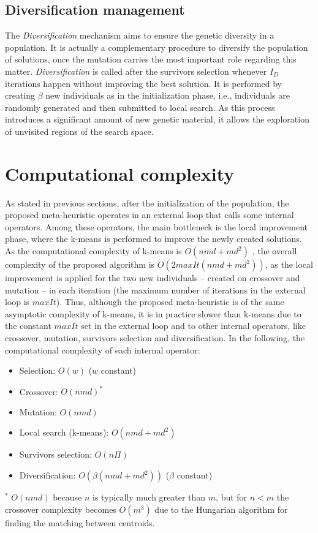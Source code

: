 \subsection{Diversification management}
The \textit{Diversification} mechanism aims to ensure the genetic diversity in a population. It is actually a complementary procedure to diversify the population of solutions, once the mutation carries the most important role regarding this matter. \textit{Diversification} is called after the survivors selection whenever $I_D$ iterations happen without improving the best solution. It is performed by creating $\beta$ new individuals as in the initialization phase, i.e., individuals are randomly generated and then submitted to local search. As this process introduces a significant amount of new genetic material, it allows the exploration of unvisited regions of the search space.

\section{Computational complexity}
As stated in previous sections, after the initialization of the population, the proposed meta-heuristic operates in an external loop that calls some internal operators. Among these operators, the main bottleneck is the local improvement phase, where the k-means is performed to improve the newly created solutions. As the computational complexity of k-means is $O(nmd + md^2)$ \cite{Hamerly2010}, the overall complexity of the proposed algorithm is $O(2 maxIt (nmd + md^2))$, as the local improvement is applied for the two new individuals -- created on crossover and mutation -- in each iteration (the maximum number of iterations in the external loop is $maxIt$). Thus, although the proposed meta-heuristic is of the same asymptotic complexity of k-means, it is in practice slower than k-means due to the constant $maxIt$ set in the external loop and to other internal operators, like crossover, mutation, survivors selection and diversification. In the following, the computational complexity of each internal operator:



\begin{itemize}

	\item Selection: $O(w)$ ($w$ constant)

	\item Crossover: $O(nmd)^{*}$

	\item Mutation: $O(nmd)$

	\item Local search (k-means): $O(nmd + md^2)$

	\item Survivors selection: $O(n\Pi)$

	\item Diversification: $O(\beta (nmd + md^2))$ ($\beta$ constant)

\end{itemize}

$^{*}$ $O(nmd)$ because $n$ is typically much greater than $m$, but for $n < m$ the crossover complexity becomes $O(m^{3})$ due to the Hungarian algorithm for finding the matching between centroids.
